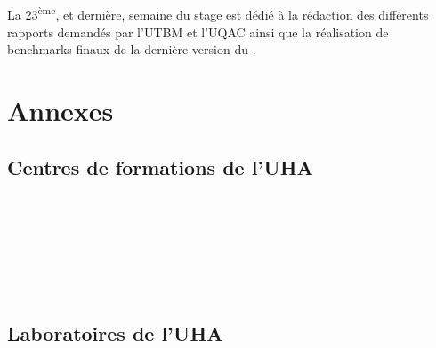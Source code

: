 \documentclass[a4paper,11pt,twoside,french,report]{../common/simplem}
\begin{document}
				\paragraph*{}
					La 23\textsuperscript{ème}, et dernière, semaine du stage est dédié à la rédaction des différents rapports demandés par l'\gls{UTBM} et l'\gls{UQAC} ainsi que la réalisation de benchmarks finaux de la dernière version du \solver{}.
	\printbibliography[heading=bibintoc]{}
	\printglossary[type=\acronymtype,nogroupskip=true,title=Lexique,toctitle=Lexique]{}
	\chapter*{Annexes}
		\setcounter{section}{0}
		\renewcommand{\thesection}{\Alph{section}}
		\renewcommand{\theHsection}{appendixsection.\Alph{section}}
		\section{Centres de formations de l'\acrshort{UHA}}\label{sec:uha_formation}
			\paragraph*{}
				
				\hfill\\
			\paragraph*{}
				
				\hfill\\
			\paragraph*{}
				
				\hfill\\
		\newpage\section{Laboratoires de l'\acrshort{UHA}}\label{sec:uha_laboratories}
			\paragraph*{}
				
				\hfill\\
			\paragraph*{}
				
				\hfill\\
\end{document}
